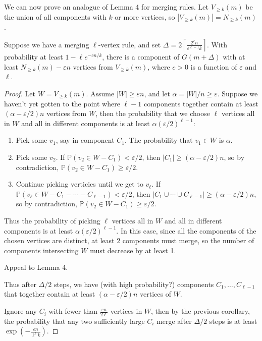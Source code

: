 \documentclass[twoside,10pt]{report}
\begin{document}
We can now prove an analogue of Lemma 4 for merging rules. Let $V_{\geq k}(m)$ be the union of all components with $k$ or more vertices, so $|V_{\geq k}(m)| = N_{\geq k}(m)$.

\setcounter{lem}{5}
\begin{lem}
	Suppose we have a merging $\ell$-vertex rule, and set $\Delta = 2 \left\lceil \frac{2^{\ell}n}{\varepsilon^{\ell-1}k} \right\rceil$. With probability at least $1- \ell e^{-cn/k}$, there is a component of $G(m+\Delta)$ with at least $N_{\geq k}(m)-\varepsilon n$ vertices from $V_{\geq k}(m)$, where $c>0$ is a function of $\varepsilon$ and $\ell$.
\end{lem}
\begin{proof}
	Let $W = V_{\geq k}(m)$. Assume $|W| \geq \varepsilon n$, and let $\alpha = |W|/n \geq \varepsilon$. Suppose we haven't yet gotten to the point where $\ell-1$ components together contain at least $(\alpha-\varepsilon/2)n$ vertices from $W$, then the probability that we choose $\ell$ vertices all in $W$ and all in different components is at least $\alpha(\varepsilon/2)^{\ell-1}$:
	\begin{enumerate}
		\item Pick some $v_1$, say in component $C_1$. The probability that $v_1 \in W$ is $\alpha$.
		\item Pick some $v_2$. If $\mathbb{P}(v_2 \in W-C_1) < \varepsilon/2$, then $|C_1| \geq (\alpha-\varepsilon/2)n$, so by contradiction, $\mathbb{P}(v_2 \in W-C_1) \geq \varepsilon/2$.
		\item Continue picking verticies until we get to $v_{\ell}$. If $\mathbb{P}(v_{\ell} \in W-C_1-\cdots-C_{\ell-1}) < \varepsilon/2$, then $|C_1 \cup \cdots \cup C_{\ell-1}| \geq (\alpha-\varepsilon/2)n$, so by contradiction, $\mathbb{P}(v_2 \in W-C_1) \geq \varepsilon/2$.
	\end{enumerate}
	Thus the probability of picking $\ell$ vertices all in $W$ and all in different components is at least $\alpha(\varepsilon/2)^{\ell-1}$. In this case, since all the components of the chosen vertices are distinct, at least 2 components must merge, so the number of components intersecting $W$ must decrease by at least 1.

	{\color{red}Appeal to Lemma 4.}

	Thus after $\Delta/2$ steps, we have {\color{red}(with high probability?)} components $C_1, \dots, C_{\ell-1}$ that together contain at least $(\alpha-\varepsilon/2)n$ vertices of $W$.

	Ignore any $C_i$ with fewer than $\frac{\varepsilon n}{2\ell} $ vertices in $W$, then by the previous corollary, the probability that any two sufficiently large $C_i$ merge after $\Delta/2$ steps is at least $\exp\left(-\frac{\varepsilon n}{\ell^\ell k}\right)$.


\end{proof}
\end{document}

